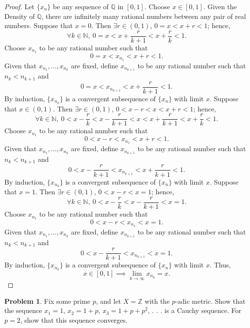 \documentclass{amsart}
\theoremstyle{definition}
\newtheorem{problem}{Problem}
\begin{document}
\begin{proof}
    Let $\{x_n\}$ be any sequence of $\mathbb{Q}$ in $[0,1]$. Choose $x \in [0,1]$. Given the Density of $\mathbb{Q}$, there are infinitely many rational numbers between any pair of real numbers. Suppose that $x = 0$. Then $\exists r \in (0,1)$, $0 = x < x + r < 1$; hence,
    \[
    \forall k \in \mathbb{N}, \ 0 = x < x + \frac{r}{k+1} < x + \frac{r}{k} < 1.
    \]
    Choose $x_{n_1}$ to be any rational number such that 
    \[
    0 = x < x_{n_1} < x + r < 1.
    \]
    Given that $x_{n_1},...,x_{n_k}$ are fixed, define $x_{n_{k+1}}$ to be any rational number such that $n_k < n_{k+1}$ and 
    \[
    0 = x < x_{n_{k+1}} < x + \frac{r}{k+1} < 1.
    \]
    By induction, $\{x_{n_k}\}$ is a convergent subsequence of $\{x_n\}$ with limit $x$. Suppose that $x \in (0,1)$. Then $\exists r \in (0,1)$, $0 < x - r < x < x + r < 1$; hence, 
    \[
    \forall k \in \mathbb{N}, \ 0 < x - \frac{r}{k} < x - \frac{r}{k+1} < x < x + \frac{r}{k+1} < x + \frac{r}{k} < 1.
    \]
    Choose $x_{n_1}$ to be any rational number such that
    \[
    0 < x - r < x_{n_1} < x + r < 1.
    \]
    Given that $x_{n_1},...,x_{n_k}$ are fixed, define $x_{n_{k+1}}$ to be any rational number such that $n_k < n_{k+1}$ and 
    \[
    0 < x - \frac{r}{k+1} < x_{n_{k+1}} < x + \frac{r}{k+1} < 1. 
    \]
    By induction, $\{x_{n_k}\}$ is a convergent subsequence of $\{x_n\}$ with limit $x$. Suppose that $x = 1$. Then $\exists r \in (0,1)$, $0 < x - r < x = 1$; hence, 
    \[
    \forall k \in \mathbb{N}, \ 0 < x - \frac{r}{k}< x - \frac{r}{k+1} < x = 1.
    \]
    Choose $x_{n_1}$ to be any rational number such that
    \[
    0 < x - r < x_{n_1} < x = 1.
    \]
    Given that $x_{n_1},...,x_{n_k}$ are fixed, define $x_{n_{k+1}}$ to be any rational number such that $n_k < n_{k+1}$ and
    \[
    0 < x - \frac{r}{k+1} < x_{n_{k+1}} < x = 1.
    \]
    By induction, $\{x_{n_k}\}$ is a convergent subsequence of $\{x_n\}$ with limit $x$. Thus, 
    \[
    x \in [0,1] \implies \lim_{k \to \infty}x_{n_k} = x.
    \]
\end{proof}

\begin{problem}
    Fix some prime $p$, and let $X = \mathbb{Z}$ with the $p$-adic metric. Show that the sequence $x_1 = 1$, $x_2 = 1 + p$, $x_3 = 1 + p + p^2$, . . . is a Cauchy sequence. For $p = 2$, show that this sequence converges.
\end{problem}
\end{document}
